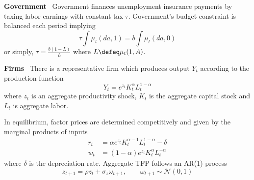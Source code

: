 \documentclass[a4paper,10pt]{article}  %
\begin{document}
\textbf{Government} \ Government finances unemployment insurance payments by taxing labor earnings with constant tax $\tau$.
Government's budget constraint is balanced each period implying
\begin{equation*}
   \label{eq:gov_budget}
   \tau \int \mu_t( da,1 ) = b \int \mu_t( da,0 )
\end{equation*}
or simply, $ \tau = \frac{b ( 1-L )}{L} $ where $ L \defeq \mu_t( 1, A) $.

\bigskip
\textbf{Firms} \ There is a representative firm which produces output $ Y_t $ according to the production function
\begin{equation*}
   \label{eq:prod_fnc}
   Y_t = e^{z_t} K_t^{\alpha} L_t^{ 1- \alpha }
\end{equation*}
where $ z_t $ is an aggregate productivity shock, $K_t$ is the aggregate capital stock and $ L_t $ is aggregate labor.

In equilibrium, factor prices are determined competitively and given by the marginal products of inputs
\begin{align*}
   \label{eq:factor_prices}
   r_t & = \alpha e^{z_t} K_t^{ \alpha-1 } L_t^{ 1- \alpha } - \delta \\
   w_t & = ( 1- \alpha ) e^{z_t} K_t^{ \alpha } L_t^{ - \alpha }
\end{align*}
%
where $ \delta $ is the depreciation rate. Aggregate TFP follows an AR(1) process
\begin{equation}
   \label{eq:tfp}
   z_{t+1} = \rho z_t + \sigma_z \omega_{t+1}, \qquad \omega_{t+1} \sim \mathcal{N}( 0,1 )
\end{equation}
\end{document}
